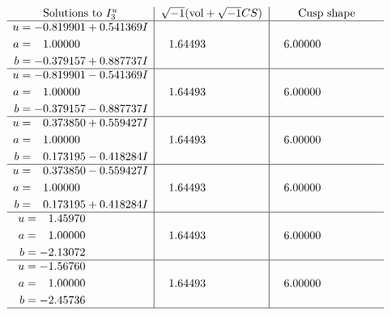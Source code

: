 \documentclass[1p]{elsarticle_modified}
\theoremstyle{definition}
\newcommand{\I}{\sqrt{-1}}
\begin{document}
$$\begin{array}{c|c|c}  
\text{Solutions to }I^u_{3}& \I (\text{vol} + \sqrt{-1}CS) & \text{Cusp shape}\\
 \hline 
\begin{aligned}
u &= -0.819901 + 0.541369 I \\
a &= \phantom{-}1.00000\phantom{ +0.000000I} \\
b &= -0.379157 + 0.887737 I\end{aligned}
 & \phantom{-}1.64493\phantom{ +0.000000I} & \phantom{-}6.00000\phantom{ +0.000000I} \\ \hline\begin{aligned}
u &= -0.819901 - 0.541369 I \\
a &= \phantom{-}1.00000\phantom{ +0.000000I} \\
b &= -0.379157 - 0.887737 I\end{aligned}
 & \phantom{-}1.64493\phantom{ +0.000000I} & \phantom{-}6.00000\phantom{ +0.000000I} \\ \hline\begin{aligned}
u &= \phantom{-}0.373850 + 0.559427 I \\
a &= \phantom{-}1.00000\phantom{ +0.000000I} \\
b &= \phantom{-}0.173195 - 0.418284 I\end{aligned}
 & \phantom{-}1.64493\phantom{ +0.000000I} & \phantom{-}6.00000\phantom{ +0.000000I} \\ \hline\begin{aligned}
u &= \phantom{-}0.373850 - 0.559427 I \\
a &= \phantom{-}1.00000\phantom{ +0.000000I} \\
b &= \phantom{-}0.173195 + 0.418284 I\end{aligned}
 & \phantom{-}1.64493\phantom{ +0.000000I} & \phantom{-}6.00000\phantom{ +0.000000I} \\ \hline\begin{aligned}
u &= \phantom{-}1.45970\phantom{ +0.000000I} \\
a &= \phantom{-}1.00000\phantom{ +0.000000I} \\
b &= -2.13072\phantom{ +0.000000I}\end{aligned}
 & \phantom{-}1.64493\phantom{ +0.000000I} & \phantom{-}6.00000\phantom{ +0.000000I} \\ \hline\begin{aligned}
u &= -1.56760\phantom{ +0.000000I} \\
a &= \phantom{-}1.00000\phantom{ +0.000000I} \\
b &= -2.45736\phantom{ +0.000000I}\end{aligned}
 & \phantom{-}1.64493\phantom{ +0.000000I} & \phantom{-}6.00000\phantom{ +0.000000I}\\
 \hline 
 \end{array}$$\newpage\newpage\renewcommand{\arraystretch}{1}
\end{document}
